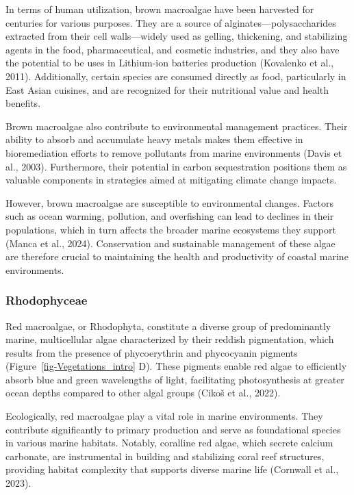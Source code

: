 \documentclass[
  letterpaper,
  11pt,
  english,
  singlespacing,
  headsepline]{MastersDoctoralThesis}
\begin{document}
\begin{spacing}{1.5}
In terms of human utilization, brown macroalgae have been harvested for
centuries for various purposes. They are a source of
alginates---polysaccharides extracted from their cell walls---widely
used as gelling, thickening, and stabilizing agents in the food,
pharmaceutical, and cosmetic industries, and they also have the
potential to be uses in Lithium-ion batteries production (Kovalenko et
al., 2011). Additionally, certain species are consumed directly as food,
particularly in East Asian cuisines, and are recognized for their
nutritional value and health benefits.

Brown macroalgae also contribute to environmental management practices.
Their ability to absorb and accumulate heavy metals makes them effective
in bioremediation efforts to remove pollutants from marine environments
(Davis et al., 2003). Furthermore, their potential in carbon
sequestration positions them as valuable components in strategies aimed
at mitigating climate change impacts.

However, brown macroalgae are susceptible to environmental changes.
Factors such as ocean warming, pollution, and overfishing can lead to
declines in their populations, which in turn affects the broader marine
ecosystems they support (Manca et al., 2024). Conservation and
sustainable management of these algae are therefore crucial to
maintaining the health and productivity of coastal marine environments.

\subsubsection{Rhodophyceae}\label{rhodophyceae}

Red macroalgae, or Rhodophyta, constitute a diverse group of
predominantly marine, multicellular algae characterized by their reddish
pigmentation, which results from the presence of phycoerythrin and
phycocyanin pigments (Figure~\ref{fig-Vegetations_intro} D). These
pigments enable red algae to efficiently absorb blue and green
wavelengths of light, facilitating photosynthesis at greater ocean
depths compared to other algal groups (Cikoš et al., 2022).

Ecologically, red macroalgae play a vital role in marine environments.
They contribute significantly to primary production and serve as
foundational species in various marine habitats. Notably, coralline red
algae, which secrete calcium carbonate, are instrumental in building and
stabilizing coral reef structures, providing habitat complexity that
supports diverse marine life (Cornwall et al., 2023).


\end{spacing}
\end{document}
